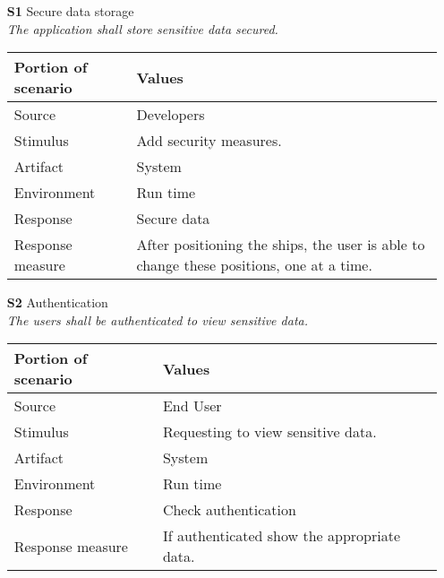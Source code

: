 \begin{itemize}
    \item[\textbf{S1}] Secure data storage \\
    \textit{\small{The application shall store sensitive data secured.}}
        
    \begin{tabular}{| l | p{7cm} |}
        \hline
        \rowcolor[gray]{0.8}
        \textbf{Portion of scenario} & \textbf{Values} \\
        \hline
        Source & Developers \\
        Stimulus & Add security measures. \\
        Artifact & System \\
        Environment & Run time \\
        Response & Secure data  \\
        Response measure & After positioning the ships, the user is able to change these positions, one at a time. \\
        \hline
    \end{tabular}

    \item[\textbf{S2}] Authentication \\
    \textit{\small{The users shall be authenticated to view sensitive data.}}
        
    \begin{tabular}{| l | p{7cm} |}
        \hline
        \rowcolor[gray]{0.8}
        \textbf{Portion of scenario} & \textbf{Values} \\
        \hline
        Source & End User \\
        Stimulus & Requesting to view sensitive data. \\
        Artifact & System \\
        Environment & Run time \\
        Response & Check authentication \\
        Response measure & If authenticated show the appropriate data. \\
        \hline
    \end{tabular}
\end{itemize}